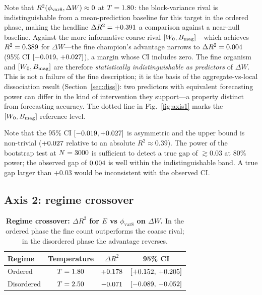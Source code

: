 \documentclass[aps,pre,preprint,superscriptaddress,showpacs]{revtex4-2}
\begin{document}
Note that $R^2(\phi_{\rm var8}, \Delta W) \approx 0$ at $T=1.80$: the block-variance rival is indistinguishable from a mean-prediction baseline for this target in the ordered phase, making the headline $\Delta R^2=+0.391$ a comparison against a near-null baseline.
Against the more informative coarse rival $[W_0, B_{\rm mag}]$---which achieves $R^2=0.389$ for $\Delta W$---the fine champion's advantage narrows to $\Delta R^2=0.004$ (95\% CI $[-0.019,\,+0.027]$), a margin whose CI includes zero.
The fine organism and $[W_0, B_{\rm mag}]$ are therefore \emph{statistically indistinguishable as predictors} of $\Delta W$.
This is not a failure of the fine description; it is the basis of the aggregate-vs-local dissociation result (Section~\ref{sec:diss}): two predictors with equivalent forecasting power can differ in the kind of intervention they support---a property distinct from forecasting accuracy.
The dotted line in Fig.~\ref{fig:axis1} marks the $[W_0, B_{\rm mag}]$ reference level.

Note that the 95\% CI $[-0.019,+0.027]$ is asymmetric
and the upper bound is non-trivial ($+0.027$ relative to an
absolute $R^2 \approx 0.39$).
The power of the bootstrap test at $N=3000$ is sufficient to
detect a true gap of $\gtrsim 0.03$ at 80\% power; the observed gap
of $0.004$ is well within the indistinguishable band.
A true gap larger than $+0.03$ would be inconsistent with the observed CI.

\subsection{Axis 2: regime crossover}
\label{sec:axis2}

\begin{table}[h]
\centering
\caption{\textbf{Regime crossover: $\Delta R^2$ for $E$ vs
$\phi_{\mathrm{var8}}$ on $\Delta W$.}
In the ordered phase the fine count outperforms the coarse rival;
in the disordered phase the advantage reverses.}
\label{tab:crossover}
\begin{tabular}{lccc}
\toprule
Regime & Temperature & $\Delta R^2$ & 95\% CI \\
\midrule
Ordered    & $T=1.80$ & $+0.178$ & $[+0.152,\,+0.205]$ \\
Disordered & $T=2.50$ & $-0.071$  & $[-0.089,\,-0.052]$   \\
\bottomrule
\end{tabular}
\end{table}
\end{document}
